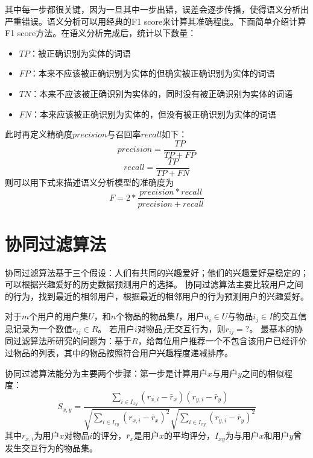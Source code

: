 其中每一步都很关键，因为一旦其中一步出错，误差会逐步传播，使得语义分析出严重错误。语义分析可以用经典的F1 score来计算其准确程度。下面简单介绍计算F1 score方法。在语义分析完成后，统计以下数量：
\begin{center}
\begin{itemize}
	\item $TP$：被正确识别为实体的词语
	\item $FP$：本来不应该被正确识别为实体的但确实被正确识别为实体的词语
	\item $TN$：本来不应该被正确识别为实体的，同时没有被正确识别为实体的词语
	\item $FN$：本来应该被正确识别为实体的，但没有被正确识别为实体的词语
\end{itemize}
\end{center}
此时再定义精确度$precision$与召回率$recall$如下：
\begin{equation}
precision= \frac{TP}{TP+FP}
\end{equation}
\begin{equation}
recall= \frac{TP}{TP+FN}
\end{equation}
则可以用下式来描述语义分析模型的准确度为
\begin{equation}
F= 2* \frac{precision*recall}{precision+recall}
\end{equation}
\section{协同过滤算法}
协同过滤算法基于三个假设：人们有共同的兴趣爱好；他们的兴趣爱好是稳定的；可以根据兴趣爱好的历史数据预测用户的选择。
协同过滤算法主要比较用户之间的行为，找到最近的相邻用户，根据最近的相邻用户的行为预测用户的兴趣爱好。

对于$m$个用户的用户集$U$，和$n$个物品的物品集$I$，用户$u_i \in U$与物品$i_j \in I$的交互信息记录为一个数值$r_{ij} \in R$。
若用户$i$对物品$j$无交互行为，则$r_{ij}=?$。
最基本的协同过滤算法所研究的问题为：基于$R$，给每位用户推荐一个不包含该用户已经评价过物品的列表，其中的物品按照符合用户兴趣程度递减排序。

协同过滤算法能分为主要两个步骤：第一步是计算用户$x$与用户$y$之间的相似程度：
\begin{equation}
S_{x,y} = \frac{\sum_{i\in I_{xy}}(r_{x,i}-\bar{r}_x)(r_{y,i}-\bar{r}_y)}{\sqrt{\sum_{i\in I_{xy}}(r_{x,i}-\bar{r}_x)^2}\sqrt{\sum_{i\in I_{xy}}(r_{y,i}-\bar{r}_y)^2}}
\end{equation}
其中$r_{x,i}$为用户$x$对物品$i$的评分，$\bar{r}_x$是用户$x$的平均评分，$I_{xy}$为与用户$x$和用户$y$曾发生交互行为的物品集。

